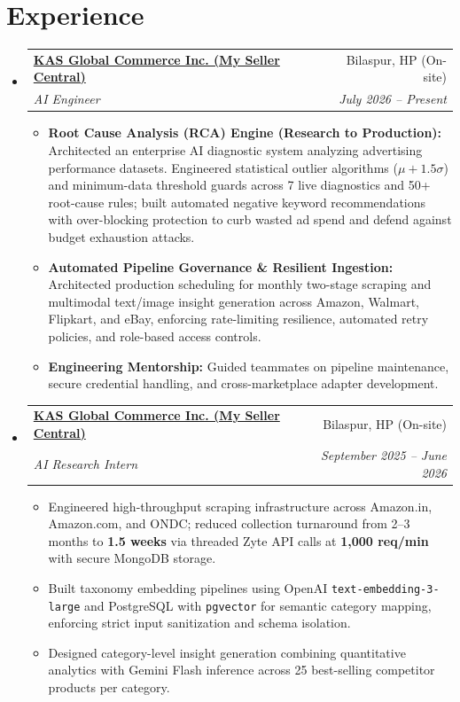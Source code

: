 \documentclass[letterpaper,10pt]{article}
\makeatletter
\newcommand{\resumeItem}[1]{\item\small{#1}}
\newcommand{\resumeSubheading}[4]{
\vspace{-1pt}\item
  \begin{tabular*}{0.97\textwidth}[t]{l@{\extracolsep{\fill}}r}
    \textbf{#1} & #2 \\
    \textit{#3} & \textit{#4} \\
  \end{tabular*}\vspace{-7pt}
}
\newcommand{\resumeSubHeadingList}{\begin{itemize}[leftmargin=0.15in, label={}]}
\newcommand{\resumeSubHeadingListEnd}{\end{itemize}}
\newcommand{\resumeItemListStart}{\begin{itemize}[leftmargin=0.25in]}
\newcommand{\resumeItemListEnd}{\end{itemize}\vspace{-6pt}}
\makeatother
\begin{document}
\section{Experience}
\resumeSubHeadingList
  \resumeSubheading
      {\href{https://mysellercentral.com/}{KAS Global Commerce Inc. (My Seller Central)}}{Bilaspur, HP (On-site)}
      {AI Engineer}{July 2026 -- Present}
      \resumeItemListStart
          \resumeItem{\textbf{Root Cause Analysis (RCA) Engine (Research to Production):} Architected an enterprise AI diagnostic system analyzing advertising performance datasets. Engineered statistical outlier algorithms ($\mu + 1.5\sigma$) and minimum-data threshold guards across 7 live diagnostics and 50+ root-cause rules; built automated negative keyword recommendations with over-blocking protection to curb wasted ad spend and defend against budget exhaustion attacks.}
          \resumeItem{\textbf{Automated Pipeline Governance \& Resilient Ingestion:} Architected production scheduling for monthly two-stage scraping and multimodal text/image insight generation across Amazon, Walmart, Flipkart, and eBay, enforcing rate-limiting resilience, automated retry policies, and role-based access controls.}
          \resumeItem{\textbf{Engineering Mentorship:} Guided teammates on pipeline maintenance, secure credential handling, and cross-marketplace adapter development.}
      \resumeItemListEnd

  \resumeSubheading
      {\href{https://mysellercentral.com/}{KAS Global Commerce Inc. (My Seller Central)}}{Bilaspur, HP (On-site)}
      {AI Research Intern}{September 2025 -- June 2026}
      \resumeItemListStart
          \resumeItem{Engineered high-throughput scraping infrastructure across Amazon.in, Amazon.com, and ONDC; reduced collection turnaround from 2--3 months to \textbf{1.5 weeks} via threaded Zyte API calls at \textbf{1,000 req/min} with secure MongoDB storage.}
          \resumeItem{Built taxonomy embedding pipelines using OpenAI \texttt{text-embedding-3-large} and PostgreSQL with \texttt{pgvector} for semantic category mapping, enforcing strict input sanitization and schema isolation.}
          \resumeItem{Designed category-level insight generation combining quantitative analytics with Gemini Flash inference across 25 best-selling competitor products per category.}
      \resumeItemListEnd
\resumeSubHeadingListEnd
\end{document}
